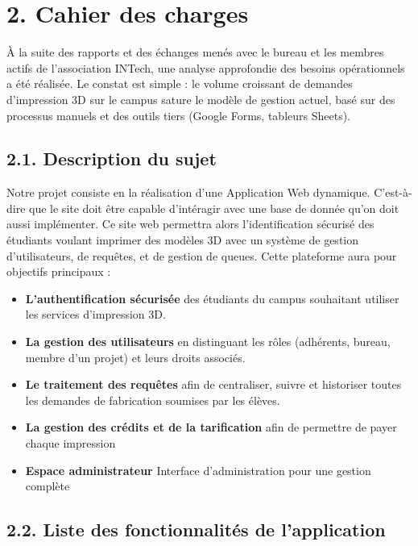 \newpage

\hypertarget{cahier-des-charges}{%
\section{2. Cahier des charges}\label{cahier-des-charges}}

À la suite des rapports et des échanges menés avec le bureau et les
membres actifs de l'association INTech, une analyse approfondie des
besoins opérationnels a été réalisée. Le constat est simple : le volume
croissant de demandes d'impression 3D sur le campus sature le modèle de
gestion actuel, basé sur des processus manuels et des outils tiers
(Google Forms, tableurs Sheets).

\hypertarget{description-du-sujet}{%
\subsection{2.1. Description du sujet}\label{description-du-sujet}}

Notre projet consiste en la réalisation d'une Application Web dynamique.
C'est-à-dire que le site doit être capable d'intéragir avec une base de
donnée qu'on doit aussi implémenter. Ce site web permettra alors
l'identification sécurisé des étudiants voulant imprimer des modèles 3D
avec un système de gestion d'utilisateurs, de requêtes, et de gestion de
queues. Cette plateforme aura pour objectifs principaux :

\begin{itemize}
\tightlist
\item
  \textbf{L'authentification sécurisée} des étudiants du campus
  souhaitant utiliser les services d'impression 3D.
\item
  \textbf{La gestion des utilisateurs} en distinguant les rôles
  (adhérents, bureau, membre d'un projet) et leurs droits associés.
\item
  \textbf{Le traitement des requêtes} afin de centraliser, suivre et
  historiser toutes les demandes de fabrication soumises par les élèves.
\item
  \textbf{La gestion des crédits et de la tarification} afin de
  permettre de payer chaque impression
\item
  \textbf{Espace administrateur} Interface d'administration pour une
  gestion complète
\end{itemize}

\newpage

\hypertarget{liste-des-fonctionnalituxe9s-de-lapplication}{%
\subsection{2.2. Liste des fonctionnalités de
l'application}\label{liste-des-fonctionnalituxe9s-de-lapplication}}

